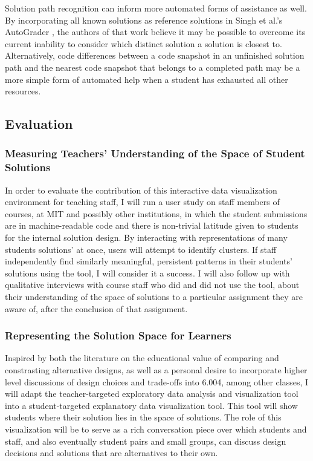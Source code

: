 \documentclass[12pt]{article}
\begin{document}

Solution path recognition can inform more automated forms of assistance as well. By incorporating all known solutions as reference solutions in Singh et al.'s AutoGrader \cite{rishabh}, the authors of that work believe it may be possible to overcome its current inability to consider which distinct solution a solution is closest to. Alternatively, code differences between a code snapshot in an unfinished solution path and the nearest code snapshot that belongs to a completed path may be a more simple form of automated help when a student has exhausted all other resources. %

\subsection{Evaluation}

\subsubsection{Measuring Teachers' Understanding of the Space of Student Solutions}

In order to evaluate the contribution of this interactive data visualization environment for teaching staff, I will run a user study on staff members of courses, at MIT and possibly other institutions, in which the student submissions are in machine-readable code and there is non-trivial latitude given to students for the internal solution design. By interacting with representations of many students solutions' at once, users will attempt to identify clusters. If staff independently find similarly meaningful, persistent patterns in their students' solutions using the tool, I will consider it a success. I will also follow up with qualitative interviews with course staff who did and did not use the tool, about their understanding of the space of solutions to a particular assignment they are aware of, after the conclusion of that assignment.

\subsubsection{Representing the Solution Space for Learners}

Inspired by both the literature on the educational value of comparing and constrasting alternative designs, as well as a personal desire to incorporate higher level discussions of design choices and trade-offs into 6.004, among other classes, I will adapt the teacher-targeted exploratory data analysis and visualization tool into a student-targeted explanatory data visualization tool. This tool will show students where their solution lies in the space of solutions. The role of this visualization will be to serve as a rich conversation piece over which students and staff, and also eventually student pairs and small groups, can discuss design decisions and solutions that are alternatives to their own. 
\end{document}
